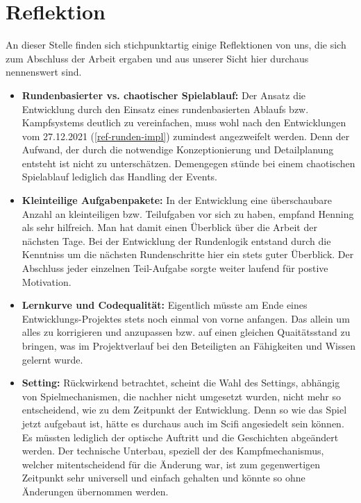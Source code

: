 
\section{Reflektion}

An dieser Stelle finden sich stichpunktartig einige Reflektionen von uns, die sich zum Abschluss der Arbeit ergaben und aus unserer Sicht hier durchaus nennenswert sind. 

\begin{itemize}

    \item \textbf{Rundenbasierter vs. chaotischer Spielablauf:} Der Ansatz die Entwicklung durch den Einsatz eines rundenbasierten Ablaufs bzw. Kampfsystems deutlich zu vereinfachen, muss wohl nach den Entwicklungen vom 27.12.2021 (\ref{ref-runden-impl}) zumindest angezweifelt werden. Denn der Aufwand, der durch die notwendige Konzeptionierung und Detailplanung entsteht ist nicht zu unterschätzen. Demengegen stünde bei einem chaotischen Spielablauf lediglich das Handling der Events. 

    \item \textbf{Kleinteilige Aufgabenpakete:} In der Entwicklung eine überschaubare Anzahl an kleinteiligen bzw. Teilufgaben vor sich zu haben, empfand Henning als sehr hilfreich. Man hat damit einen Überblick über die Arbeit der nächsten Tage. Bei der Entwicklung der Rundenlogik entstand durch die Kenntniss um die nächsten Rundenschritte hier ein stets guter Überblick. Der Abschluss jeder einzelnen Teil-Aufgabe sorgte weiter laufend für postive Motivation.

    \item \textbf{Lernkurve und Codequalität:} Eigentlich müsste am Ende eines Entwicklungs-Projektes stets noch einmal von vorne anfangen. Das allein um alles zu korrigieren und anzupassen bzw. auf einen gleichen Quaitätsstand zu bringen, was im Projektverlauf bei den Beteiligten an Fähigkeiten und Wissen gelernt wurde.
    
    \item \textbf{Setting:} Rückwirkend betrachtet, scheint die Wahl des Settings, abhängig von Spielmechanismen, die nachher nicht umgesetzt wurden, nicht mehr so entscheidend, wie zu dem Zeitpunkt der Entwicklung. Denn so wie das Spiel jetzt aufgebaut ist, hätte es durchaus auch im Scifi angesiedelt sein können. Es müssten lediglich der optische Auftritt und die Geschichten abgeändert werden. Der technische Unterbau, speziell der des Kampfmechanismus, welcher mitentscheidend für die Änderung war, ist zum gegenwertigen Zeitpunkt sehr universell und einfach gehalten und könnte so ohne Änderungen übernommen werden.


\end{itemize}
